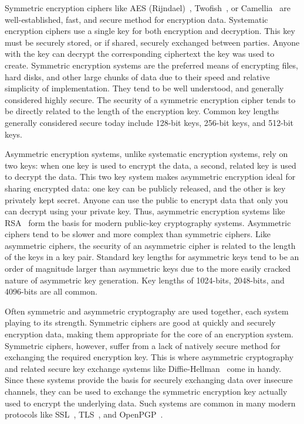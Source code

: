 Symmetric encryption ciphers like AES (Rijndael)~\cite{Daemen1999},
Twofish~\cite{Schneier1998}, or Camellia~\cite{Matsui2004} are
well-established, fast, and secure method for encryption
data. Systematic encryption ciphers use a single key for both
encryption and decryption. This key must be securely stored, or if
shared, securely exchanged between parties. Anyone with the key can
decrypt the corresponding ciphertext the key was used to
create. Symmetric encryption systems are the preferred means of
encrypting files, hard disks, and other large chunks of data due to
their speed and relative simplicity of implementation. They tend to be
well understood, and generally considered highly secure. The security
of a symmetric encryption cipher tends to be directly related to the
length of the encryption key. Common key lengths generally considered
secure today include 128-bit keys, 256-bit keys, and 512-bit keys.

Asymmetric encryption systems, unlike systematic encryption systems,
rely on two keys: when one key is used to encrypt the data, a second,
related key is used to decrypt the data. This two key system makes
asymmetric encryption ideal for sharing encrypted data: one key can be
publicly released, and the other is key privately kept secret. Anyone
can use the public to encrypt data that only you can decrypt using
your private key. Thus, asymmetric encryption systems like
RSA~\cite{Rivest1978} form the basis for modern public-key
cryptography systems. Asymmetric ciphers tend to be slower and more
complex than symmetric ciphers. Like asymmetric ciphers, the security
of an asymmetric cipher is related to the length of the keys in a key
pair. Standard key lengths for asymmetric keys tend to be an order of
magnitude larger than asymmetric keys due to the more easily cracked
nature of asymmetric key generation. Key lengths of 1024-bits,
2048-bits, and 4096-bits are all common.

Often symmetric and asymmetric cryptography are used together, each
system playing to its strength. Symmetric ciphers are good at quickly
and securely encryption data, making them appropriate for the core of
an encryption system. Symmetric ciphers, however, suffer from a lack
of natively secure method for exchanging the required encryption
key. This is where asymmetric cryptography and related secure key
exchange systems like Diffie-Hellman~\cite{Diffie1976} come in
handy. Since these systems provide the basis for securely exchanging
data over insecure channels, they can be used to exchange the
symmetric encryption key actually used to encrypt the underlying
data. Such systems are common in many modern protocols like
SSL~\cite{Freier2011}, TLS~\cite{Dierks2008}, and
OpenPGP~\cite{Callas2007, openpgp}.

